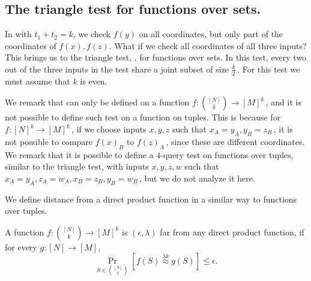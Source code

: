 \documentclass{toc}
\newcommand\f{f} %
\newcommand{\g}{g} %
\newcommand\neql[1]{\stackrel{{#1}}{ \approx}} %
\newcommand{\sets}{\binom{[N]}{k}} %
\begin{document}
\subsection{The triangle test for functions over sets.}
In  with $t_1+t_2=k$, we check $\f(y)$ on all coordinates, but only part of the coordinates of $\f(x),\f(z)$. What if we check all coordinates of all three inputs? This brings us to the triangle test, , for functions over sets. In this test, every two out of the three inputs in the test share a joint subset of size $\frac{k}{2}$\,. For this test we must assume that $k$ is even.

We remark that  can only be defined on a function $\f:\sets\rightarrow[M]^k$\,, and it is not possible to define such test on a function on tuples. This is because for $\f:[N]^k\rightarrow[M]^k$\,, if we choose inputs $x,y,z$ such that $x_A=y_A,y_B=z_B$\,, it is not possible to compare $\f(x)_B$ to $\f(z)_A$\,, since these are different coordinates. We remark that it is possible to define a $4$-query test on functions over tuples, similar to the triangle test, with inputs $x,y,z,w$ such that $x_A = y_A,z_A = w_A, x_B = z_B, y_B = w_B$\,, but we do not analyze it here.

We define distance from a direct product function in a similar way to functions over tuples.
\begin{definition}
    A function $\f:\sets\rightarrow[M]^k$ is $(\epsilon,\lambda)$ far from any direct product function, if for every $\g:[N]\rightarrow[M]$,
    \[ \Pr_{S\in\sets}[\f(S)\neql{\lambda k}\g(S)]\leq\epsilon. \]
\end{definition}
\end{document}
